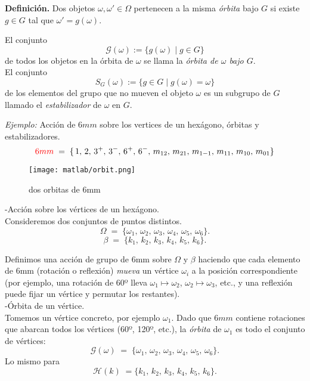 \documentclass{report}
\begin{document}
\textbf{Definición.} Dos objetos \( \omega, \omega' \in \Omega \) pertenecen a la misma \textit{órbita} bajo \( G \) si existe \( g \in G \) tal que \( \omega' = g(\omega) \).

El conjunto 
\[
\mathcal{G}(\omega) := \{ g(\omega) \mid g \in G \}
\]
de todos los objetos en la órbita de \( \omega \) se llama la \textit{órbita de \( \omega \) bajo \( G \)}.\\
\vspace{.2cm}
El conjunto 
\[
S_G(\omega) := \{ g \in G \mid g(\omega) = \omega \}
\]
de los elementos del grupo que no mueven el objeto \( \omega \) es un subgrupo de \( G \) llamado el \textit{estabilizador} de \( \omega \) en \( G \).\\
\vspace{.2cm}



\vspace{.4cm}


\textit{Ejemplo:} Acción de \(6mm\) sobre los vertices de un hexágono, órbitas y estabilizadores.\\

\[
 \textcolor{red}{6mm}
\;=\;
\{\,1,\,2,\,3^+,\,3^-,\,6^+,\,6^-,\,m_{12},\,m_{21},\,m_{1-1},\,m_{11},\,m_{10},\,m_{01}\}
\]


\begin{figure}[h!]
\centering
\texttt{[image: matlab/orbit.png]} 
\caption{dos orbitas de 6mm}
\end{figure}













\medskip

-Acción sobre los vértices de un hexágono.\\

\vspace{.2cm}
Consideremos dos conjuntos de puntos distintos.
\[
\Omega \;=\; \{\omega_1,\,\omega_2,\,\omega_3,\,\omega_4,\,\omega_5,\,\omega_6\}.
\]
\[
\beta \;=\; \{k_1,\,k_2,\,k_3,\,k_4,\,k_5,\,k_6\}.
\]

Definimos una acción de grupo de 6mm sobre \(\Omega\) y $\beta$ haciendo que cada elemento de 6mm (rotación o reflexión) \emph{mueva} un vértice \(\omega_i\) a la posición correspondiente (por ejemplo, una rotación de 60º lleva \(\omega_1 \mapsto \omega_2\), \(\omega_2 \mapsto \omega_3\), etc., y una reflexión puede fijar un vértice y permutar los restantes).\\
\vspace{.2cm}
-Órbita de un vértice.\\
Tomemos un vértice concreto, por ejemplo \(\omega_1\). Dado que \(6mm\) contiene rotaciones que abarcan todos los vértices (60º, 120º, etc.), la \emph{órbita} de \(\omega_1\) es todo el conjunto de vértices:
\[
\mathcal{G}(\omega)
\;=\;
\{\omega_1,\,\omega_2,\,\omega_3,\,\omega_4,\,\omega_5,\,\omega_6\}.
\]
Lo mismo para 
\[
\mathcal{H}(k)
\;= \{k_1,\,k_2,\,k_3,\,k_4,\,k_5,\,k_6\}.
\]
\end{document}
